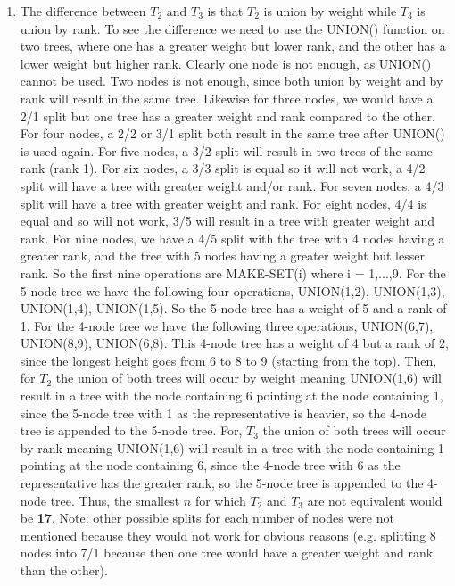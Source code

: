 \documentclass{article}
\begin{document}
\begin{enumerate}[label=(\alph*)]
\item The difference between $T_2$ and $T_3$ is that $T_2$ is union by weight while $T_3$ is union by rank. To see the difference we need to use the UNION() function on two trees, where one has a greater weight but lower rank, and the other has a lower weight but higher rank. Clearly one node is not enough, as UNION() cannot be used. Two nodes is not enough, since both union by weight and by rank will result in the same tree. Likewise for three nodes, we would have a 2/1 split but one tree has a greater weight and rank compared to the other. For four nodes, a 2/2 or 3/1 split both result in the same tree after UNION() is used again. For five nodes, a 3/2 split will result in two trees of the same rank (rank 1). For six nodes, a 3/3 split is equal so it will not work, a 4/2 split will have a tree with greater weight and/or rank. For seven nodes, a 4/3 split will have a tree with greater weight and rank. For eight nodes, 4/4 is equal and so will not work, 3/5 will result in a tree with greater weight and rank. For nine nodes, we have a 4/5 split with the tree with 4 nodes having a greater rank, and the tree with 5 nodes having a greater weight but lesser rank. So the first nine operations are MAKE-SET(i) where i = 1,...,9. For the 5-node tree we have the following four operations, UNION(1,2), UNION(1,3), UNION(1,4), UNION(1,5). So the 5-node tree has a weight of 5 and a rank of 1. For the 4-node tree we have the following three operations, UNION(6,7), UNION(8,9), UNION(6,8). This 4-node tree has a weight of 4 but a rank of 2, since the longest height goes from 6 to 8 to 9 (starting from the top). Then, for $T_2$ the union of both trees will occur by weight meaning UNION(1,6) will result in a tree with the node containing 6 pointing at the node containing 1, since the 5-node tree with 1 as the representative is heavier, so the 4-node tree is appended to the 5-node tree. For, $T_3$ the union of both trees will occur by rank meaning UNION(1,6) will result in a tree with the node containing 1 pointing at the node containing 6, since the 4-node tree with 6 as the representative has the greater rank, so the 5-node tree is appended to the 4-node tree. Thus, the smallest $n$ for which $T_2$ and $T_3$ are not equivalent would be \textbf{\underline{17}}. Note: other possible splits for each number of nodes were not mentioned because they would not work for obvious reasons (e.g. splitting 8 nodes into 7/1 because then one tree would have a greater weight and rank than the other).

\end{enumerate}
\end{document}
